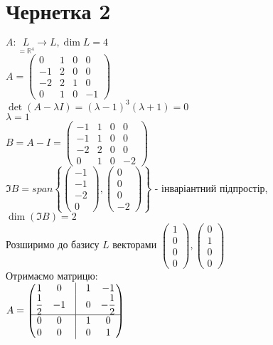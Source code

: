 \documentclass[a4paper, 10pt]{article}
\theoremstyle{theoremdd}
\theoremstyle{theoremdd}
\theoremstyle{theoremdd}
\theoremstyle{theoremdd}
\theoremstyle{theoremdd}
\theoremstyle{theoremdd}
\theoremstyle{theoremdd}
\theoremstyle{theoremdd}
\begin{document}
\section*{Чернетка 2}
$A: \underset{= \mathbb{R}^4}{L} \to L, \dim L = 4$\\
$A = \begin{pmatrix}
0 & 1 & 0 & 0 \\
-1 & 2 & 0 & 0 \\
-2 & 2 & 1 & 0 \\
0 & 1 & 0 & -1
\end{pmatrix}$\\
$\det(A-\lambda I) = (\lambda - 1)^3(\lambda + 1) = 0$\\
$\lambda = 1$\\
$B = A - I = \begin{pmatrix}
-1 & 1 & 0 & 0 \\
-1 & 1 & 0 & 0 \\
-2 & 2 & 0 & 0 \\
0 & 1 & 0 & -2
\end{pmatrix}$\\
$\Im B = span\left\{ \begin{pmatrix} -1 \\ -1 \\ -2 \\ 0 \end{pmatrix}, \begin{pmatrix} 0 \\ 0 \\ 0 \\ -2 \end{pmatrix} \right\}$ - інваріантний підпростір, \\ $\dim (\Im B) = 2$\\
Розширимо до базису $L$ векторами $\begin{pmatrix} 1 \\ 0 \\ 0 \\ 0 \end{pmatrix}, \begin{pmatrix} 0 \\ 1 \\ 0 \\ 0 \end{pmatrix}$\\
Отримаємо матрицю:\\
$A = \begin{pmatrix}
1 & 0 & \vline & 1 & -1 \\
\dfrac{1}{2} & -1 & \vline & 0 & -\dfrac{1}{2} \\
\hline
0 & 0 & \vline & 1 & 0 \\
0 & 0 & \vline & 0 & 1
\end{pmatrix}$\\
\end{document}

